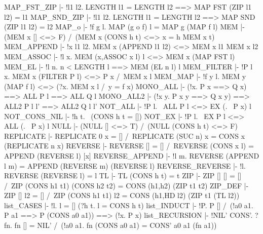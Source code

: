 \ENDTHEOREM
\THEOREM MAP\_FST\_ZIP
  |- !l1 l2. LENGTH l1 = LENGTH l2 ==> MAP FST (ZIP l1 l2) = l1
\ENDTHEOREM
\THEOREM MAP\_SND\_ZIP
  |- !l1 l2. LENGTH l1 = LENGTH l2 ==> MAP SND (ZIP l1 l2) = l2
\ENDTHEOREM
\THEOREM MAP\_o
  |- !f g l. MAP (g o f) l = MAP g (MAP f l)
\ENDTHEOREM
\THEOREM MEM
  |- (MEM x [] <=> F) /\ (MEM x (CONS h t) <=> x = h \/ MEM x t)
\ENDTHEOREM
\THEOREM MEM\_APPEND
  |- !x l1 l2. MEM x (APPEND l1 l2) <=> MEM x l1 \/ MEM x l2
\ENDTHEOREM
\THEOREM MEM\_ASSOC
  |- !l x. MEM (x,ASSOC x l) l <=> MEM x (MAP FST l)
\ENDTHEOREM
\THEOREM MEM\_EL
  |- !l n. n < LENGTH l ==> MEM (EL n l) l
\ENDTHEOREM
\THEOREM MEM\_FILTER
  |- !P l x. MEM x (FILTER P l) <=> P x /\ MEM x l
\ENDTHEOREM
\THEOREM MEM\_MAP
  |- !f y l. MEM y (MAP f l) <=> (?x. MEM x l /\ y = f x)
\ENDTHEOREM
\THEOREM MONO\_ALL
  |- (!x. P x ==> Q x) ==> ALL P l ==> ALL Q l
\ENDTHEOREM
\THEOREM MONO\_ALL2
  |- (!x y. P x y ==> Q x y) ==> ALL2 P l l' ==> ALL2 Q l l'
\ENDTHEOREM
\THEOREM NOT\_ALL
  |- !P l. ~ALL P l <=> EX (\x. ~P x) l
\ENDTHEOREM
\THEOREM NOT\_CONS\_NIL
  |- !h t. ~(CONS h t = [])
\ENDTHEOREM
\THEOREM NOT\_EX
  |- !P l. ~EX P l <=> ALL (\x. ~P x) l
\ENDTHEOREM
\THEOREM NULL
  |- (NULL [] <=> T) /\ (NULL (CONS h t) <=> F)
\ENDTHEOREM
\THEOREM REPLICATE
  |- REPLICATE 0 x = [] /\ REPLICATE (SUC n) x = CONS x (REPLICATE n x)
\ENDTHEOREM
\THEOREM REVERSE
  |- REVERSE [] = [] /\ REVERSE (CONS x l) = APPEND (REVERSE l) [x]
\ENDTHEOREM
\THEOREM REVERSE\_APPEND
  |- !l m. REVERSE (APPEND l m) = APPEND (REVERSE m) (REVERSE l)
\ENDTHEOREM
\THEOREM REVERSE\_REVERSE
  |- !l. REVERSE (REVERSE l) = l
\ENDTHEOREM
\THEOREM TL
  |- TL (CONS h t) = t
\ENDTHEOREM
\THEOREM ZIP
  |- ZIP [] [] = [] /\
     ZIP (CONS h1 t1) (CONS h2 t2) = CONS (h1,h2) (ZIP t1 t2)
\ENDTHEOREM
\THEOREM ZIP\_DEF
  |- ZIP [] l2 = [] /\ ZIP (CONS h1 t1) l2 = CONS (h1,HD l2) (ZIP t1 (TL l2))
\ENDTHEOREM
\THEOREM list\_CASES
  |- !l. l = [] \/ (?h t. l = CONS h t)
\ENDTHEOREM
\THEOREM list\_INDUCT
  |- !P. P [] /\ (!a0 a1. P a1 ==> P (CONS a0 a1)) ==> (!x. P x)
\ENDTHEOREM
\THEOREM list\_RECURSION
  |- !NIL' CONS'.
         ?fn. fn [] = NIL' /\ (!a0 a1. fn (CONS a0 a1) = CONS' a0 a1 (fn a1))
\ENDTHEOREM

